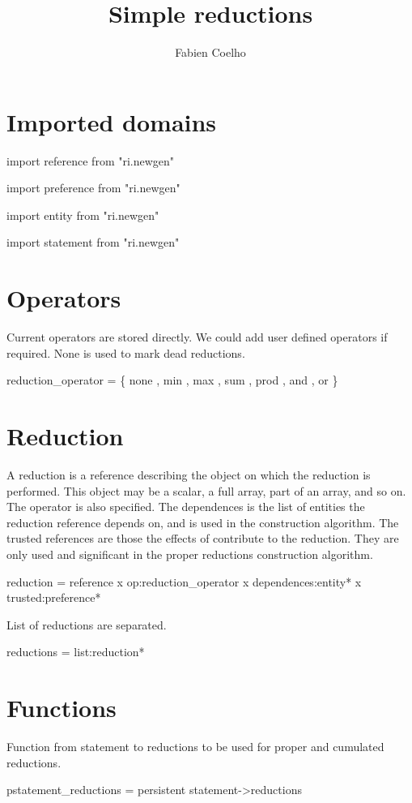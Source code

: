 \documentclass{article}
\title{Simple reductions}
\author{Fabien Coelho}
\newcommand{\domain}[1]{\par{#1}}
\begin{document}
\maketitle

\section{Imported domains}
\label{sec:import}

\domain{import reference from "ri.newgen"}
\domain{import preference from "ri.newgen"}
\domain{import entity from "ri.newgen"}
\domain{import statement from "ri.newgen"}

\section{Operators}
\label{sec:operators}

Current operators are stored directly.
We could add user defined operators if required.
None is used to mark dead reductions. 

\domain{reduction\_operator = \{ none , min , max , sum , prod , and , or \}}


\section{Reduction}
\label{sec:reduction}

A reduction is a reference describing the object on which the reduction is
performed. This object may be a scalar, a full array, part of an array,
and so on. The operator is also specified. The dependences is the list of
entities the reduction reference depends on, and is used in the
construction algorithm. The trusted references are those the effects of
contribute to the reduction. They are only used and significant in the
proper reductions construction algorithm.

\domain{reduction = reference x op:reduction\_operator x dependences:entity* x trusted:preference*}

List of reductions are separated.

\domain{reductions = list:reduction*}


\section{Functions}
\label{sec:functions}

Function from statement to reductions to be used for proper and cumulated
reductions. 

\domain{pstatement\_reductions = persistent statement->reductions}
\end{document}
